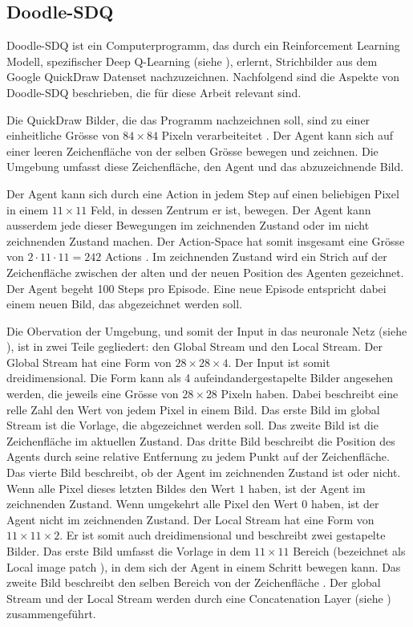 \subsection{Doodle-SDQ}\label{sub:t_ver_dood} Doodle-SDQ ist ein
Computerprogramm, das durch ein Reinforcement Learning Modell, spezifischer Deep
Q-Learning (siehe ), erlernt, Strichbilder aus dem Google
QuickDraw Datenset \cite{noauthor_quick_2022}
nachzuzeichnen. Nachfolgend sind die Aspekte von Doodle-SDQ beschrieben, die für
diese Arbeit relevant sind.

Die QuickDraw Bilder, die das Programm nachzeichnen soll, sind zu einer
einheitliche Grösse von $84\times84$ Pixeln verarbeiteitet \cite[S.
7]{zhou_learning_2018}. Der Agent kann sich auf einer leeren Zeichenfläche von
der selben Grösse bewegen und zeichnen. Die Umgebung umfasst diese
Zeichenfläche, den Agent und das abzuzeichnende Bild.

Der Agent kann sich durch eine Action in jedem Step auf einen beliebigen Pixel
in einem $11\times11$ Feld, in dessen Zentrum er ist, bewegen. Der Agent kann
ausserdem jede dieser Bewegungen im zeichnenden Zustand oder im nicht
zeichnenden Zustand machen. Der Action-Space hat somit insgesamt eine Grösse von
$2\cdot11\cdot11 = 242$ Actions \cite[S. 5]{zhou_learning_2018}. Im zeichnenden
Zustand wird ein Strich auf der Zeichenfläche zwischen der alten und der neuen
Position des Agenten gezeichnet. Der Agent begeht 100 Steps pro Episode. Eine
neue Episode entspricht dabei einem neuen Bild, das abgezeichnet werden soll.

Die Obervation der Umgebung, und somit der Input in das neuronale Netz (siehe
), ist in zwei Teile gegliedert: den Global Stream und
den Local Stream. Der Global Stream hat eine Form von $28\times28\times4$. Der
Input ist somit dreidimensional. Die Form kann als 4 aufeindandergestapelte
Bilder angesehen werden, die jeweils eine Grösse von $28\times28$ Pixeln haben.
Dabei beschreibt eine relle Zahl den Wert von jedem Pixel in einem Bild. Das
erste Bild im global Stream ist die Vorlage, die abgezeichnet werden soll. Das
zweite Bild ist die Zeichenfläche im aktuellen Zustand. Das dritte Bild
beschreibt die Position des Agents durch seine relative Entfernung zu jedem
Punkt auf der Zeichenfläche. Das vierte Bild beschreibt, ob der Agent im
zeichnenden Zustand ist oder nicht. Wenn alle Pixel dieses letzten Bildes den
Wert $1$ haben, ist der Agent im zeichnenden Zustand. Wenn umgekehrt alle Pixel
den Wert $0$ haben, ist der Agent nicht im zeichnenden Zustand. Der Local Stream
hat eine Form von $11\times11\times2$. Er ist somit auch dreidimensional und
beschreibt zwei gestapelte Bilder. Das erste Bild umfasst die Vorlage in dem
$11\times11$ Bereich (bezeichnet als Local image patch \cite[S.
5]{zhou_learning_2018}), in dem sich der Agent in einem Schritt bewegen kann.
Das zweite Bild beschreibt den selben Bereich von der Zeichenfläche \cite[S. 4
ff.]{zhou_learning_2018}. Der global Stream und der Local Stream werden durch
eine Concatenation Layer (siehe ) zusammengeführt. 

